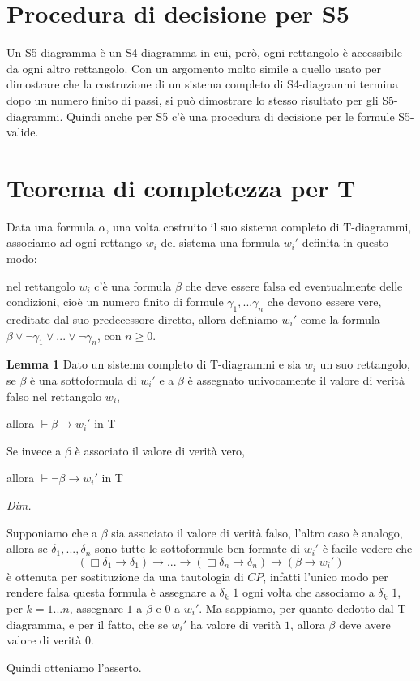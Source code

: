 \documentclass[a4paper, titlepage, 12pt]{report}
\begin{document}
\section{Procedura di decisione per S5}
Un S5-diagramma è un S4-diagramma in cui, però, ogni rettangolo è accessibile
da ogni altro rettangolo. Con un argomento molto simile a quello usato
per dimostrare che la costruzione di un sistema completo di S4-diagrammi termina dopo
un numero finito di passi, si può dimostrare lo stesso risultato per gli S5-diagrammi.
Quindi anche per S5 c'è una procedura di decisione per le formule S5-valide.


\section{Teorema di completezza per T}
Data una formula $\alpha$, una volta costruito il suo sistema completo di T-diagrammi,
associamo ad ogni rettango $w_i$ del sistema una formula $w_i'$ definita in questo modo:

nel rettangolo $w_i$ c'è una formula $\beta$ che deve essere falsa ed eventualmente delle condizioni,
cioè un numero finito di formule $\gamma_1, ...\gamma_n$ che devono essere vere, ereditate
dal suo predecessore diretto, allora definiamo $w_i'$ come la formula
$\beta \lor \neg \gamma_1 \lor ... \lor \neg \gamma_n$, con $n \geq 0$.

\begin{flushleft}
\textbf{Lemma 1}
Dato un sistema completo di T-diagrammi e sia $w_i$ un suo rettangolo,
se $\beta$ è una sottoformula di $w_i'$ e a $\beta$ è assegnato univocamente il valore di verità falso
nel rettangolo $w_i$,

allora $\vdash \beta \rightarrow w_i'$ in T

Se invece a $\beta$ è associato il valore di verità vero,


allora $\vdash \neg \beta \rightarrow w_i'$ in T

\textit{Dim.}

Supponiamo che a $\beta$ sia associato il valore di verità falso, l'altro caso è analogo,
allora se $\delta_1, ..., \delta_n$ sono tutte le sottoformule ben formate di $w_i'$ è
facile vedere che
$$(\Box \delta_1 \rightarrow \delta_1) \rightarrow ... \rightarrow (\Box \delta_n \rightarrow \delta_n) \rightarrow (\beta \rightarrow w_i')$$
è ottenuta per sostituzione da una tautologia di $CP$, infatti l'unico modo per rendere
falsa questa formula è assegnare a $\delta_k$ $1$ ogni volta che associamo a $\delta_k$ $1$,
per $k = 1 ... n$, assegnare $1$ a $\beta$ e $0$ a $w_i'$.
Ma sappiamo, per quanto dedotto dal T-diagramma, e per il fatto,
che se $w_i'$ ha valore di verità $1$,
allora $\beta$ deve avere valore di verità $0$.

Quindi otteniamo l'asserto.

\end{flushleft}
\end{document}
